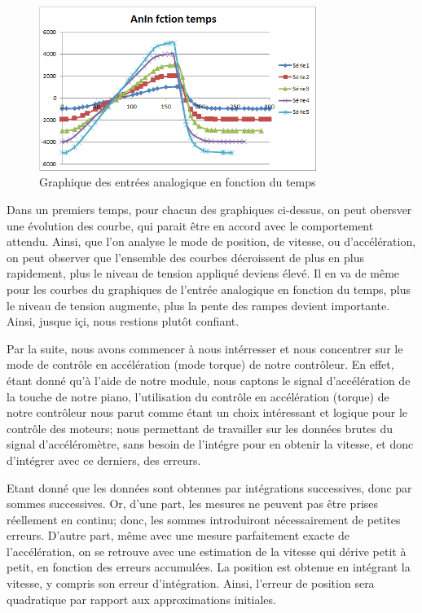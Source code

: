 \documentclass[french,a4paper,12pt]{report}
\begin{document}
{\begin{figure}[h]
\begin{minipage}[c]{.46\linewidth}
         \centering
         \includegraphics[width=9cm]{m1_AnIn.png}
         \caption{Graphique des entrées analogique en fonction du temps}
     \end{minipage}
 	\end{figure}} 
		
	Dans un premiers temps, pour chacun des graphiques ci-dessus, on peut obersver une évolution des courbe, qui parait être en accord avec le comportement attendu. Ainsi, que l'on analyse le mode de position, de vitesse, ou d'accélération, on peut observer que l'ensemble des courbes décroissent de plus en plus rapidement, plus le niveau de tension appliqué deviens élevé. Il en va de même pour les courbes du graphiques de l'entrée analogique en fonction du temps, plus le niveau de tension augmente, plus la pente des rampes devient importante. Ainsi, jusque içi, nous restions plutôt confiant.
	
	Par la suite, nous avons commencer à nous intérresser et nous concentrer sur le mode de contrôle en accélération (mode torque) de notre contrôleur. En effet, étant donné qu'à l'aide de notre module, nous captons le signal d'accélération de la touche de notre piano, l'utilisation du contrôle en accélération (torque) de notre contrôleur nous parut comme étant un choix intéressant et logique pour le contrôle des moteurs; nous permettant de travailler sur les données brutes du signal d'accéléromètre, sans besoin de l'intégre pour en obtenir la vitesse, et donc d'intégrer avec ce derniers, des erreurs.
	
	Etant donné que les données sont obtenues par intégrations successives, donc par sommes successives. Or, d'une part, les mesures ne peuvent pas être prises réellement en continu; donc, les sommes introduiront nécessairement de petites erreurs. D'autre part, même avec une mesure parfaitement exacte de l'accélération, on se retrouve avec une estimation de la vitesse qui dérive petit à petit, en fonction des erreurs accumulées. La position est obtenue en intégrant la vitesse, y compris son erreur d'intégration. Ainsi, l'erreur de position sera quadratique par rapport aux approximations initiales. 
	
\end{document}

